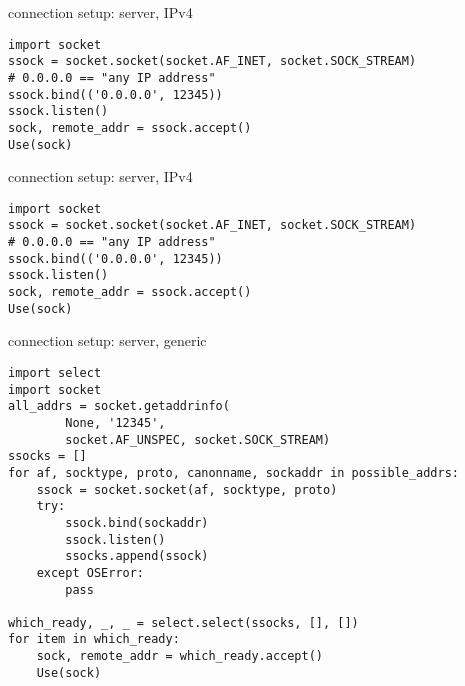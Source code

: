 \begin{frame}[fragile]{connection setup: server, IPv4}
\begin{Verbatim}[fontsize=\small]
import socket
ssock = socket.socket(socket.AF_INET, socket.SOCK_STREAM)
# 0.0.0.0 == "any IP address"
ssock.bind(('0.0.0.0', 12345))
ssock.listen()
sock, remote_addr = ssock.accept()
Use(sock)
\end{Verbatim}
\end{frame}

\begin{frame}[fragile]{connection setup: server, IPv4}
\begin{Verbatim}[fontsize=\small]
import socket
ssock = socket.socket(socket.AF_INET, socket.SOCK_STREAM)
# 0.0.0.0 == "any IP address"
ssock.bind(('0.0.0.0', 12345))
ssock.listen()
sock, remote_addr = ssock.accept()
Use(sock)
\end{Verbatim}
\end{frame}

\begin{frame}[fragile,label=connSetupServerLookup]{connection setup: server, generic}
\begin{Verbatim}[fontsize=\fontsize{9}{10}]
import select
import socket
all_addrs = socket.getaddrinfo(
        None, '12345',
        socket.AF_UNSPEC, socket.SOCK_STREAM)
ssocks = []
for af, socktype, proto, canonname, sockaddr in possible_addrs:
    ssock = socket.socket(af, socktype, proto)
    try:
        ssock.bind(sockaddr)
        ssock.listen()
        ssocks.append(ssock)
    except OSError:
        pass

which_ready, _, _ = select.select(ssocks, [], [])
for item in which_ready:
    sock, remote_addr = which_ready.accept()
    Use(sock)
\end{Verbatim}
\end{frame}

